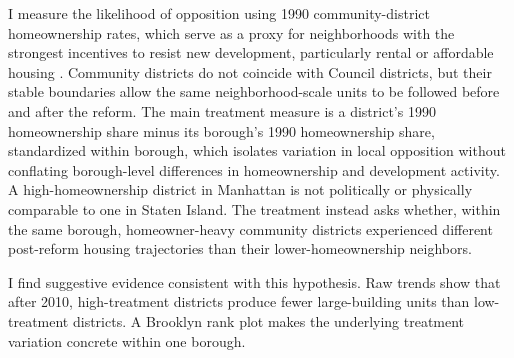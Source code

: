 I measure the likelihood of opposition using 1990 community-district homeownership rates, which serve as a proxy for neighborhoods with the strongest incentives to resist new development, particularly rental or affordable housing \cite{khan_decentralized_2021}.
Community districts do not coincide with Council districts, but their stable boundaries allow the same neighborhood-scale units to be followed before and after the reform.
The main treatment measure is a district's 1990 homeownership share minus its borough's 1990 homeownership share, standardized within borough, which isolates variation in local opposition without conflating borough-level differences in homeownership and development activity.
A high-homeownership district in Manhattan is not politically or physically comparable to one in Staten Island.
The treatment instead asks whether, within the same borough, homeowner-heavy community districts experienced different post-reform housing trajectories than their lower-homeownership neighbors.

I find suggestive evidence consistent with this hypothesis.
Raw trends show that after 2010, high-treatment districts produce fewer large-building units than low-treatment districts.
A Brooklyn rank plot makes the underlying treatment variation concrete within one borough.
